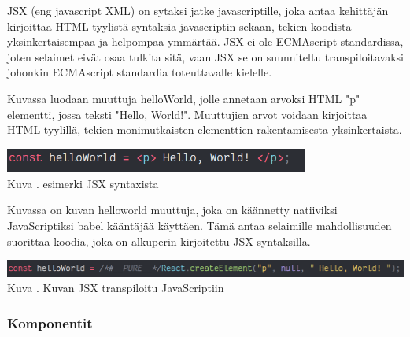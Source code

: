 







JSX (eng javascript XML) on sytaksi jatke javascriptille, joka antaa kehittäjän kirjoittaa HTML tyylistä syntaksia javascriptin sekaan, tekien koodista yksinkertaisempaa ja helpompaa ymmärtää. 
JSX ei ole ECMAscript standardissa, joten selaimet eivät osaa tulkita sitä, vaan JSX se on suunniteltu transpiloitavaksi johonkin ECMAscript standardia toteuttavalle kielelle.
\medskip

Kuvassa \nextImageCount{} luodaan muuttuja helloWorld, jolle annetaan arvoksi HTML "p"{} elementti, jossa teksti "Hello, World!"{}.
Muuttujien arvot voidaan kirjoittaa HTML tyylillä, tekien monimutkaisten elementtien rakentamisesta yksinkertaista.
\medskip

\bigskip
\includegraphics[width=10cm]{src/public/oppar/pure_jsx_example.png}\\
Kuva \getImgCount {}. esimerki JSX syntaxista
\medskip


Kuvassa \nextImageCount{} on kuvan \theimgCounter{} helloworld muuttuja, joka on käännetty natiiviksi JavaScriptiksi babel kääntäjää käyttäen. 
Tämä antaa selaimille mahdollisuuden suorittaa koodia, joka on alkuperin kirjoitettu JSX syntaksilla.
\medskip


\bigskip
\includegraphics[width=15cm]{src/public/oppar/transpiled_jsx_example.png}\\
Kuva \getImgCount {}. Kuvan \prevImageCount{} JSX transpiloitu JavaScriptiin
\medskip





\subsubsection{Komponentit}




